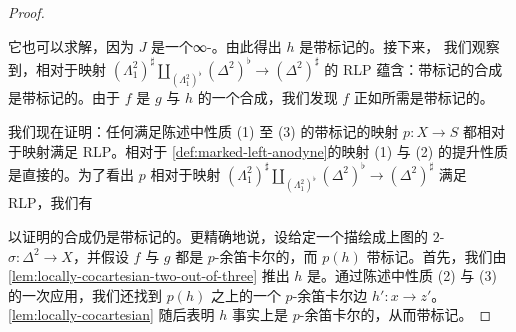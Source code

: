 \begin{proof}
\begin{center}
\end{center}
它也可以求解，因为 $J$ 是一个∞-\trGroupoid{}。由此得出 $h$ 是带标记的。接下来，
我们观察到，相对于映射 $(\Lambda^2_1)^\sharp \amalg_{(\Lambda^2_1)^\flat} (\Delta^2)^\flat \to (\Delta^2)^\sharp$ 的 RLP 蕴含：带标记\trMorphism{}的合成是带标记的。由于
$f$ 是 $g$ 与 $h$ 的一个合成，我们发现 $f$ 正如所需是带标记的。

我们现在证明：任何满足陈述中性质 (1) 至 (3) 的带标记\trSimplicialSet{}的映射
$p\colon X \to S$ 都相对于\trMarkedLeftAnodyne{}映射满足 RLP。相对于%
\cref{def:marked-left-anodyne}的映射 (1) 与 (2) 的提升性质是直接的。为了看出 $p$
相对于映射 $(\Lambda^2_1)^\sharp \amalg_{(\Lambda^2_1)^\flat} (\Delta^2)^\flat \to (\Delta^2)^\sharp$ 满足 RLP，我们有
\begin{center}
\end{center}
以证明\trMarkedEdge{}的合成仍是带标记的。更精确地说，设给定一个描绘成上图的
$2$-\trSimplex{} $\sigma\colon \Delta^2 \to X$，并假设 $f$ 与 $g$ 都是
$p$-余笛卡尔的，而 $p(h)$ 带标记。首先，我们由\cref{lem:locally-cocartesian-two-out-of-three}
推出 $h$ 是\trLocallyCocartesian。通过陈述中性质 (2) 与 (3) 的一次应用，我们还找到
$p(h)$ 之上的一个 $p$-余笛卡尔边 $h'\colon x \to z'$。\cref{lem:locally-cocartesian}
随后表明 $h$ 事实上是 $p$-余笛卡尔的，从而带标记。


\end{proof}

